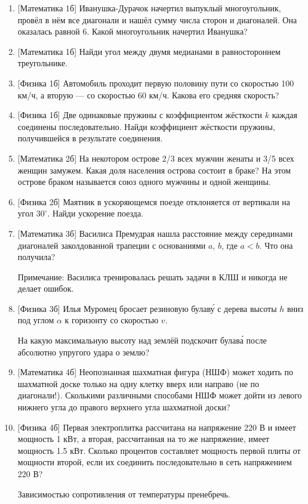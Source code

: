 \documentclass[12pt]{article} %
\begin{document}
\begin{enumerate}
    \item {[Математика 1б]} Иванушка-Дурачок начертил выпуклый многоугольник, 
    провёл в нём все диагонали и нашёл сумму числа сторон и диагоналей. Она оказалась равной 6. 
    Какой многоугольник начертил Иванушка?
    \item {[Математика 1б]} Найди угол между двумя медианами в равностороннем треугольнике.
    \item {[Физика 1б]} Автомобиль проходит первую половину пути со скоростью 100 км/ч, а вторую — со скоростью 60 км/ч. 
    Какова его средняя скорость?
    \item {[Физика 1б]} Две одинаковые пружины с коэффициентом жёсткости $k$ каждая соединены последовательно. 
    Найди коэффициент жёсткости пружины, получившейся в результате соединения.
    \item {[Математика 2б]} На некотором острове 2/3 всех мужчин женаты и 3/5 всех женщин замужем. 
    Какая доля населения острова состоит в браке? На этом острове браком называется союз одного мужчины и одной женщины.
    \item {[Физика 2б]} Маятник в ускоряющемся поезде отклоняется от вертикали на угол $30^{\circ}$. Найди
    ускорение поезда.
    \item {[Математика 3б]} Василиса Премудрая нашла расстояние между серединами диагоналей заколдованной трапеции 
    с основаниями $a$, $b$, где $a < b$. Что она получила? 
    
    Примечание: Василиса тренировалась решать задачи в КЛШ и никогда не делает ошибок.
    \item {[Физика 3б]} Илья Муромец бросает резиновую булаву́ с дерева высоты $h$ вниз под углом
    $\alpha$ к горизонту со скоростью $v$. 
    
    На какую максимальную высоту над землёй подскочит булава́ после абсолютно упругого удара о землю?
    \item {[Математика 4б]} Неопознанная шахматная фигура (НШФ) может ходить по шахматной доске только на одну клетку вверх или направо 
    (не по диагонали!). Сколькими различными способами НШФ может дойти из левого нижнего угла 
    до правого верхнего угла шахматной доски?
    \item {[Физика 4б]} Первая электроплитка рассчитана на напряжение 220 В и имеет мощность 1 кВт,
    а вторая, рассчитанная на то же напряжение, имеет мощность 1.5 кВт. 
    Сколько процентов составляет мощность первой плиты от мощности второй, 
    если их соединить последовательно в сеть напряжением 220 В? 
    
    Зависимостью сопротивления от температуры пренебречь.
\end{enumerate}
\end{document}
